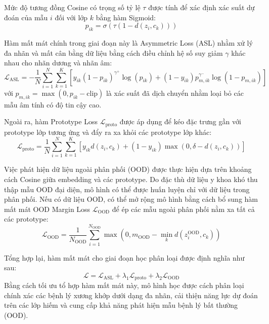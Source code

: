 Mức độ tương đồng Cosine có trọng số tỷ lệ $\tau$ được tính để xác định xác suất dự đoán của mẫu $i$ đối với lớp $k$ bằng hàm Sigmoid:
\begin{equation}
p_{ik} = \sigma\left(\tau (1 - d(z_i, c_k))\right)
\end{equation}

Hàm mất mát chính trong giai đoạn này là Asymmetric Loss (ASL) nhằm xử lý đa nhãn và mất cân bằng dữ liệu bằng cách điều chỉnh hệ số suy giảm $\gamma$ khác nhau cho nhãn dương và nhãn âm:
\begin{equation}
\mathcal{L}_{\mathrm{ASL}} = -\frac{1}{N} \sum_{i=1}^{N} \sum_{k=1}^{K} \left[ y_{ik}(1-p_{ik})^{\gamma^+}\log(p_{ik}) + (1-y_{ik})p_{m,ik}^{\gamma^-}\log(1-p_{m,ik}) \right]
\end{equation}
với $p_{m,ik} = \max(0, p_{ik} - \text{clip})$ là xác suất đã dịch chuyển nhằm loại bỏ các mẫu âm tính có độ tin cậy cao.

Ngoài ra, hàm Prototype Loss $\mathcal{L}_{\mathrm{proto}}$ được áp dụng để kéo đặc trưng gần với prototype lớp tương ứng và đẩy ra xa khỏi các prototype lớp khác:
\begin{equation}
\mathcal{L}_{\mathrm{proto}} = \frac{1}{N} \sum_{i=1}^{N} \sum_{k=1}^{K} \left[ y_{ik}d(z_i,c_k) + (1-y_{ik}) \max(0,\delta-d(z_i,c_k)) \right]
\end{equation}

Việc phát hiện dữ liệu ngoài phân phối (OOD) được thực hiện dựa trên khoảng cách Cosine giữa embedding và các prototype. Do đặc thù dữ liệu y khoa khó thu thập mẫu OOD đại diện, mô hình có thể được huấn luyện chỉ với dữ liệu trong phân phối. Nếu có dữ liệu OOD, có thể mở rộng mô hình bằng cách bổ sung hàm mất mát OOD Margin Loss $\mathcal{L}_{\mathrm{OOD}}$ để ép các mẫu ngoài phân phối nằm xa tất cả các prototype:
\begin{equation}
\mathcal{L}_{\mathrm{OOD}} = \frac{1}{N_{\mathrm{OOD}}} \sum_{i=1}^{N_{\mathrm{OOD}}} \max \left( 0, m_{\mathrm{OOD}} - \min_k d(z_i^{\mathrm{OOD}},c_k) \right)
\end{equation}

Tổng hợp lại, hàm mất mát cho giai đoạn học phân loại được định nghĩa như sau:
\begin{equation}
\mathcal{L} = \mathcal{L}_{\mathrm{ASL}} + \lambda_1 \mathcal{L}_{\mathrm{proto}} + \lambda_2 \mathcal{L}_{\mathrm{OOD}}
\end{equation}
Bằng cách tối ưu tổ hợp hàm mất mát này, mô hình học được cách phân loại chính xác các bệnh lý xương khớp dưới dạng đa nhãn, cải thiện năng lực dự đoán trên các lớp hiếm và cung cấp khả năng phát hiện mẫu bệnh lý bất thường (OOD).

